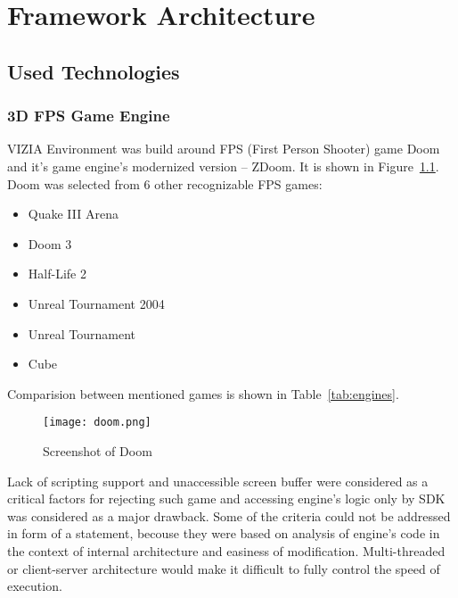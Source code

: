 
\chapter{Framework Architecture}
\label{ch:architecture}
\section{Used Technologies}
\label{sec:technologies}

\subsection{3D FPS Game Engine}


VIZIA Environment was build around FPS (First Person Shooter) game Doom and it's game engine's modernized version -- ZDoom. It is shown in Figure~\ref{fig:doom}. 
Doom was selected from 6 other recognizable FPS games: 
\begin{itemize}
\item Quake III Arena 
\item Doom 3
\item Half-Life 2 
\item Unreal Tournament 2004
\item Unreal Tournament
\item Cube
\end{itemize}
Comparision between mentioned games is shown in Table~\ref{tab:engines}.

\begin{figure}
\centering
\texttt{[image: doom.png]}
\caption{Screenshot of Doom}
\label{fig:doom}
\end{figure}
  

Lack of scripting support and unaccessible screen buffer were considered as a critical factors for rejecting such game and accessing engine's logic only by SDK was considered as a major drawback.
Some of the criteria could not be addressed in form of a statement, becouse they were based on analysis of engine's code in the context of internal architecture and easiness of modification.
Multi-threaded or client-server architecture would make it difficult to fully control the speed of execution. 


